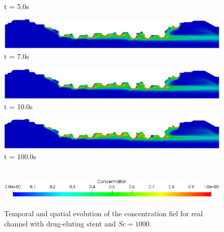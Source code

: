 \begin{figure}[H]
\begin{minipage}{.50\linewidth}
      t = 5.0s
     \end{minipage}%
     \begin{minipage}{.50\linewidth}
      \centering
      \includegraphics[scale=0.18]{./02_chaps/cap_solution/figure/conc1000_RealStrut6.png}\\
      t = 7.0s
     \end{minipage}
     \begin{minipage}{.50\linewidth}
     \medskip
      \centering
      \includegraphics[scale=0.18]{./02_chaps/cap_solution/figure/conc1000_RealStrut7.png}\\
      t = 10.0s
     \end{minipage}%
     \begin{minipage}{.50\linewidth}
     \medskip
      \centering
      \includegraphics[scale=0.18]{./02_chaps/cap_solution/figure/conc1000_RealStrut8.png}\\
      t = 100.0s
     \end{minipage}\\[10pt]
      \centering
      \includegraphics[scale=0.5]{./02_chaps/cap_solution/figure/conc1_RealStrutScale.png}\\
     \medskip
    \caption{
Temporal and spatial evolution of the concentration fiel for real channel with drug-eluting stent and $Sc=1000$.}
     \label{conc field real stent sc 1000}
\end{figure}




\newpage


